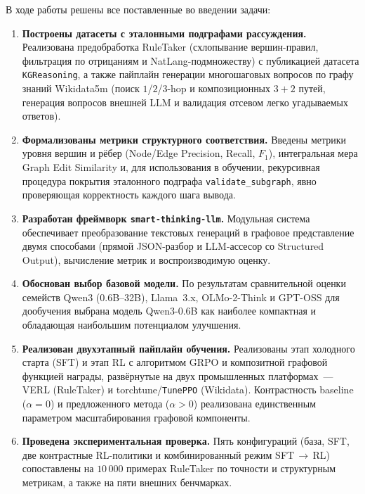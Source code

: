 В ходе работы решены все поставленные во введении задачи:
\begin{enumerate}
    \setlength{\itemsep}{\smallskipamount}
    \item \textbf{Построены датасеты с эталонными подграфами рассуждения.} Реализована предобработка RuleTaker (схлопывание вершин-правил, фильтрация по отрицаниям и NatLang-подмножеству) с публикацией датасета \texttt{KGReasoning}, а также пайплайн генерации многошаговых вопросов по графу знаний Wikidata5m (поиск $1$/$2$/$3$-hop и композиционных $3{+}2$ путей, генерация вопросов внешней LLM и валидация отсевом легко угадываемых ответов).
    \item \textbf{Формализованы метрики структурного соответствия.} Введены метрики уровня вершин и рёбер (Node/Edge Precision, Recall, $F_1$), интегральная мера Graph Edit Similarity и, для использования в обучении, рекурсивная процедура покрытия эталонного подграфа \texttt{validate\_subgraph}, явно проверяющая корректность каждого шага вывода.
    \item \textbf{Разработан фреймворк \texttt{smart-thinking-llm}.} Модульная система обеспечивает преобразование текстовых генераций в графовое представление двумя способами (прямой JSON-разбор и LLM-ассесор со Structured Output), вычисление метрик и воспроизводимую оценку.
    \item \textbf{Обоснован выбор базовой модели.} По результатам сравнительной оценки семейств Qwen3 (0.6B--32B), Llama~3.x, OLMo-2-Think и GPT-OSS для дообучения выбрана модель Qwen3-0.6B как наиболее компактная и обладающая наибольшим потенциалом улучшения.
    \item \textbf{Реализован двухэтапный пайплайн обучения.} Реализованы этап холодного старта (SFT) и этап RL с алгоритмом GRPO и композитной графовой функцией награды, развёрнутые на двух промышленных платформах~--- VERL (RuleTaker) и torchtune/\texttt{TunePPO} (Wikidata). Контрастность baseline ($\alpha=0$) и предложенного метода ($\alpha>0$) реализована единственным параметром масштабирования графовой компоненты.
    \item \textbf{Проведена экспериментальная проверка.} Пять конфигураций (база, SFT, две контрастные RL-политики и комбинированный режим SFT\,$\to$\,RL) сопоставлены на $10\,000$ примерах RuleTaker по точности и структурным метрикам, а также на пяти внешних бенчмарках.
\end{enumerate}

